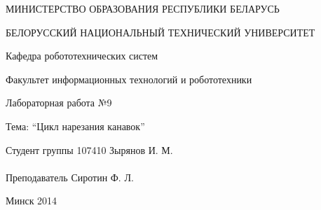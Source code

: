\begin{titlepage} %

\thispagestyle{empty} %

\begin{center}
МИНИСТЕРСТВО ОБРАЗОВАНИЯ РЕСПУБЛИКИ БЕЛАРУСЬ

БЕЛОРУССКИЙ НАЦИОНАЛЬНЫЙ ТЕХНИЧЕСКИЙ УНИВЕРСИТЕТ

Кафедра робототехнических систем

Факультет информационных технологий и робототехники
\end{center}

\vfill

\begin{center}
Лабораторная работа №9

Тема: ``Цикл нарезания канавок''
\end{center}

\vfill

\noindent
Студент группы 107410 \hfill Зырянов И. М.
\\
\\
\noindent
Преподаватель \hfill Сиротин Ф. Л.

\vfill

\centerline{Минск 2014}

\clearpage %

\end{titlepage}

\setcounter{page}{2}

